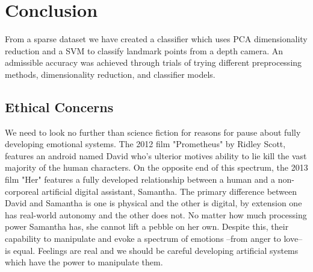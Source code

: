 \section{Conclusion}

From a sparse dataset we have created a classifier which uses PCA dimensionality reduction and a SVM to classify landmark points from a depth camera. An admissible accuracy was achieved through trials of trying different preprocessing methods, dimensionality reduction, and classifier models.

\subsection{Ethical Concerns}
We need to look no further than science fiction for reasons for pause about fully developing emotional systems. The 2012 film "Prometheus" by Ridley Scott, features an android named David who's ulterior motives ability to lie kill the vast majority of the human characters. On the opposite end of this spectrum, the 2013 film "Her" features a fully developed relationship between a human and a non-corporeal artificial digital assistant, Samantha. The primary difference between David and Samantha is one is physical and the other is digital, by extension one has real-world autonomy and the other does not. No matter how much processing power Samantha has, she cannot lift a pebble on her own. Despite this, their capability to manipulate and evoke a spectrum of emotions --from anger to love-- is equal. Feelings are real and we should be careful developing artificial systems which have the power to manipulate them.
